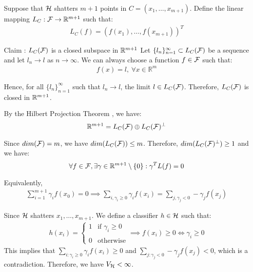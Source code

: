 \begin{proof*}
    Suppose that $\mathcal{H}$ shatters $m+1$ points in $C=(x_1, \dots, x_{m+1})$. Define the linear mapping $L_C:\mathcal{F} \to \mathbb{R}^{m+1}$ such that:
    \begin{align*}
        L_C(f) = (f(x_1), \dots, f(x_{m+1}))^T
    \end{align*}

    \begin{subproof}{\newline Claim : $L_C(\mathcal{F})$ is a closed subspace in $\mathbb{R}^{m+1}$}
        Let $\{l_n\}_{n=1}^\infty \subset L_C(\mathcal{F})$ be a sequence and let $l_n\to l$ as $n\to\infty$. We can always choose a function $f\in\mathcal{F}$ such that:
        \begin{align*}
            f(x) = l, \ \forall x \in \mathbb{R}^m
        \end{align*}

        \noindent Hence, for all $\{l_n\}_{n=1}^\infty$ such that $l_n\to l$, the limit $l\in L_C(\mathcal{F})$. Therefore, $L_C(\mathcal{F})$ is closed in $\mathbb{R}^{m+1}$.
    \end{subproof}

    \noindent By the Hilbert Projection Theorem \cite{wiki:hilbert_projection_theorem}, we have:
    \begin{align*}
        \mathbb{R}^{m+1} = L_C(\mathcal{F}) \oplus L_C(\mathcal{F})^\bot 
    \end{align*}

    \noindent Since $dim(\mathcal{F})=m$, we have $dim(L_C(\mathcal{F})) \le m$. Therefore, $dim(L_C(\mathcal{F})^\bot) \ge 1$ and we have:
    \begin{align*}
        \forall f\in\mathcal{F}, \exists \gamma \in \mathbb{R}^{m+1}\setminus \{0\} : \gamma^TL(f) = 0 
    \end{align*}

    \noindent Equivalently,
    \begin{align*}
        \sum_{i=1}^{m+1}\gamma_i f(x_0) = 0 \implies \sum_{i, \gamma_i \ge 0} \gamma_if(x_i) = \sum_{j, \gamma_j < 0} -\gamma_j f(x_j)
    \end{align*}

    \noindent Since $\mathcal{H}$ shatters $x_1, \dots, x_{m+1}$. We define a classifier $h\in\mathcal{H}$ such that:
    \begin{align*}
        h(x_i) = \begin{cases}
            1 &\text{if } \gamma_i \ge 0 
            \\ \\
            0 &\text{otherwise}
        \end{cases} 
        \implies
        f(x_i) \ge 0 \iff \gamma_i \ge 0
    \end{align*}
    \noindent This implies that $\sum_{i:\gamma_i \ge 0}\gamma_if(x_i) \ge 0$ and $\sum_{j:\gamma_j < 0}-\gamma_j f(x_j) < 0$, which is a contradiction. Therefore, we have $V_{\mathcal{H}}<\infty$.
\end{proof*}

